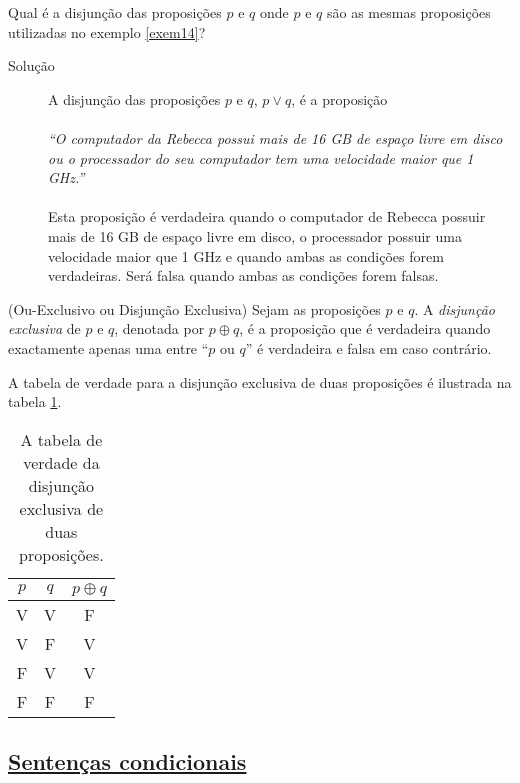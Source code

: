 \label{exem15}
\begin{exmp}
Qual é a disjunção das proposições $p$ e $q$ onde $p$ e $q$ são as mesmas
proposições utilizadas no exemplo \ref{exem14}?
\end{exmp}
\begin{description}
	\item[Solução] A disjunção das proposições $p$ e $q$, $p \lor q$, é a
	proposição\\ \\
	\emph{``O computador da Rebecca possui mais de 16 GB de espaço
	livre em disco ou o processador do seu computador tem uma velocidade maior que
	1 GHz.''} \\ \\
	
	Esta proposição é verdadeira quando o computador de Rebecca possuir mais de 16
	GB de espaço livre em disco, o processador possuir uma velocidade maior que 1
	GHz e quando ambas as condições forem verdadeiras. Será falsa quando ambas as
	condições forem falsas.
\end{description}

\begin{defn}
	\label{def14}
	(Ou-Exclusivo ou Disjunção Exclusiva) Sejam as proposições $p$ e $q$. A
	\emph{disjunção exclusiva} de $p$ e $q$, denotada por $p \oplus q$, é a
	proposição que é verdadeira quando exactamente apenas uma entre ``$p$ ou $q$''
	é verdadeira e falsa em caso contrário.
\end{defn}

A tabela de verdade para a disjunção exclusiva de duas proposições é ilustrada
na tabela \ref{tabela:14}.

\begin{table}[H]
\centering
\begin{tabular}{|c|c|c|}%
\toprule
\textbf{$p$} & \textbf{$q$} & \textbf{$p \oplus q$}\\ 
\midrule
V &	V & F\\
V &	F & V\\
F &	V & V\\
F &	F & F\\
\bottomrule%
\end{tabular}%
\caption{A tabela de verdade da disjunção exclusiva de duas proposições.}
\label{tabela:14}
\end{table}

\subsection*{\underline{Sentenças condicionais}}

